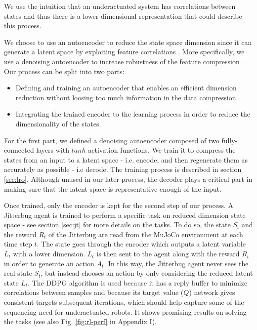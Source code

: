 \documentclass[letterpaper, 10 pt, conference]{ieeeconf}
\begin{document}
We use the intuition that an underactuated system has correlations between states %
and thus there is a lower-dimensional representation that could describe this process. 

We choose to use an autoencoder to reduce the state space dimension since it can generate a latent space by exploiting feature correlations \cite{AE_hinton2006reducing}. More specifically, we use a denoising autoencoder to increase robustness of the feature compression \cite{vincent2008extracting}.
Our process can be split into two parts:
\begin{itemize}
\item Defining and training an autoencoder that enables an efficient dimension reduction without loosing too much information in the data compression. 
\item Integrating the trained encoder to the learning process in order to reduce the dimensionality of the states.
\end{itemize}
For the first part, we defined a denoising autoencoder composed of two fully-connected layers with $tanh$ activation functions. We train it to compress the states from an input to a latent space - i.e. encode, and then regenerate them as accurately as possible - i.e decode. The training process is described in section \ref{sec:lro}. Although unused in our later process, the decoder plays a critical part in making sure that the latent space is representative enough of the input.

Once trained, only the encoder is kept for the second step of our process. A Jitterbug agent is trained to perform a specific task on reduced dimension state space - see section \ref{sec:jt} for more details on the tasks. To do so, the state $S_t$ and the reward $R_t$  of the Jitterbug are read from the MuJoCo environment \cite{Todorov2012MuJoCo} at each time step $t$. The state goes through the encoder which outputs a latent variable $L_t$ with a lower dimension. $L_t$ is then sent to the agent along with the reward $R_t$ in order to generate an action $A_t$. In this way, the Jitterbug agent never sees the real state $S_t$, but instead chooses an action by only considering the reduced latent state $L_t$. The  DDPG algorithm is used because it has a reply buffer to minimize correlations between samples and because its target value ($Q$) network gives consistent targets subsequent iterations, which should help capture some of the sequencing need for underactuated robots.  It shows promising results on solving the tasks (see also Fig. \ref{fig:rl-perf} in Appendix I).
\end{document}
